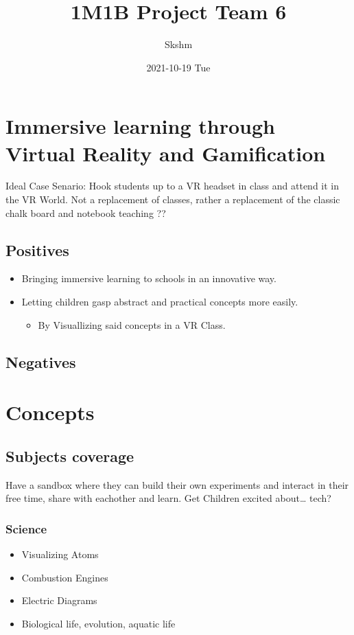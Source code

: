 \documentclass[landscape,a4paper,]{beamer}
\author{Skshm}
\date{2021-10-19 Tue}
\title{1M1B Project Team 6}
\begin{document}
\maketitle
\tableofcontents

\newpage
\section{Immersive learning through Virtual Reality and Gamification}
\label{sec:org636766b}
Ideal Case Senario: Hook students up to a VR headset in class and attend it in the VR World.
Not a replacement of classes, rather a replacement of the classic chalk board and notebook teaching ??

\subsection{Positives}
\label{sec:orgd38d740}
\begin{itemize}
\item Bringing immersive learning to schools in an innovative way.
\item Letting children gasp abstract and practical concepts more easily.
\begin{itemize}
\item By Visuallizing said concepts in a VR Class.
\end{itemize}
\end{itemize}

\subsection{Negatives}
\label{sec:orgcfe40a0}

\section{Concepts}
\label{sec:org8b8dcf1}
\subsection{Subjects coverage}
\label{sec:orga4b5ffc}
Have a sandbox where they can build their own experiments and interact in their free time, share with eachother and learn.
Get Children excited about\ldots{} tech?
\subsubsection{Science}
\label{sec:org6de6cbc}
\begin{itemize}
\item Visualizing Atoms
\item Combustion Engines
\item Electric Diagrams
\item Biological life, evolution, aquatic life
\end{itemize}
\end{document}
